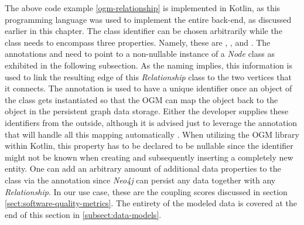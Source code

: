 \documentclass[12pt,a4paper]{report}
\begin{document}
The above code example \ref{ogm-relationship} is implemented in Kotlin, as this
programming language was used to implement the entire back-end, as discussed
earlier in this chapter. The class identifier can be chosen arbitrarily while
the class needs to encompass three properties. Namely, these are , , and . The annotations 
and  need to point to a non-nullable instance of a \textit{Node}
class as exhibited in the following subsection. As the naming implies, this
information is used to link the resulting edge of this \textit{Relationship}
class to the two vertices that it connects. The  annotation
is used to have a unique identifier once an object of the class gets
instantiated so that the OGM can map the object back to the object in the
persistent graph data storage. Either the developer supplies these identifiers
from the outside, although it is advised just to leverage the  annotation that will handle all this mapping automatically
\cite{neo4j-ogm}. When utilizing the OGM library within Kotlin, this property
has to be declared to be nullable since the identifier might not be known when
creating and subsequently inserting a completely new entity. One can
add an arbitrary amount of additional data properties to the class via the
 annotation since \textit{Neo4j} can persist any data together
with any \textit{Relationship}. In our use case, these are the coupling scores
discussed in section \ref{sect:software-quality-metrics}. The entirety of the
modeled data is covered at the end of this section in \ref{subsect:data-models}.
\end{document}
